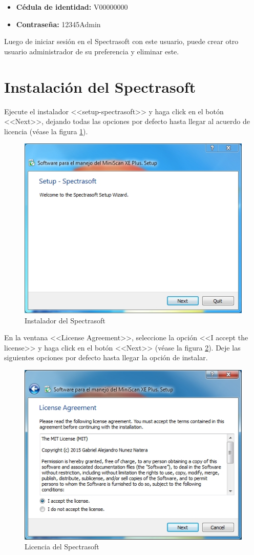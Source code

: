 \begin{itemize}
	\item \textbf{C\'{e}dula de identidad:} V00000000
	
	\item \textbf{Contrase\~{n}a:} 12345Admin
\end{itemize}

Luego de iniciar sesi\'{o}n en el Spectrasoft con este usuario, puede crear otro usuario administrador de su preferencia y eliminar este.

\section{Instalaci\'{o}n del Spectrasoft}

Ejecute el instalador <<setup-spectrasoft>> y haga click en el bot\'{o}n <<Next>>, dejando todas las opciones por defecto hasta llegar al acuerdo de licencia (v\'{e}ase la figura \ref{fig:spectrasoft-setup}).

\begin{figure}[H]
  \centering
  \includegraphics[width=.5\linewidth]{./img/spectrasoft-setup.jpg}
\caption[Instalador del Spectrasoft]{Instalador del Spectrasoft\label{fig:spectrasoft-setup}}
\end{figure}

En la ventana <<License Agreement>>, seleccione la opci\'{o}n <<I accept the license>> y haga click en el bot\'{o}n <<Next>> (v\'{e}ase la figura \ref{fig:spectrasoft-licencia}). Deje las siguientes opciones por defecto hasta llegar la opci\'{o}n de instalar.

\begin{figure}[H]
  \centering
  \includegraphics[width=.5\linewidth]{./img/spectrasoft-licencia.jpg}
\caption[Licencia del Spectrasoft]{Licencia del Spectrasoft\label{fig:spectrasoft-licencia}}
\end{figure}

